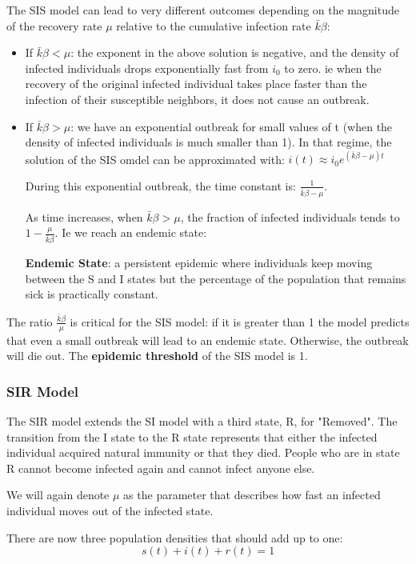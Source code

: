 \documentclass[11pt]{scrartcl} %
\begin{document}
The SIS model can lead to very different outcomes depending on the magnitude of the recovery rate $\mu$ relative to the cumulative infection rate $\bar{k} \beta$:
\begin{itemize}
	\item If $\bar{k} \beta < \mu$: the exponent in the above solution is negative, and the density of infected individuals drops exponentially fast from $i_0$ to zero. ie when the recovery of the original infected individual takes place faster than the infection of their susceptible neighbors, it does not cause an outbreak.
	\item If $\bar{k} \beta > \mu$: we have an exponential outbreak for small values of t (when the density of infected individuals is much smaller than 1). In that regime, the solution of the SIS omdel can be approximated with: $i(t) \approx i_0 e^{(\bar{k}\beta - \mu)t}$

During this exponential outbreak, the time constant is: $\frac{1}{\bar{k} \beta-\mu}$.

As time increases, when $\bar{k} \beta > \mu$, the fraction of infected individuals tends to $1-\frac{\mu}{\bar{k} \beta}$. Ie we reach an endemic state:

\textbf{Endemic State}: a persistent epidemic where individuals keep moving between the S and I states but the percentage of the population that remains sick is practically constant. 
\end{itemize}

The ratio $\frac{\bar{k} \beta}{\mu}$ is critical for the SIS model: if it is greater than 1 the model predicts that even a small outbreak will lead to an endemic state. Otherwise, the outbreak will die out. The \textbf{epidemic threshold} of the SIS model is 1.

\subsubsection{SIR Model}
The SIR model extends the SI model with a third state, R, for "Removed". The transition from the I state to the R state represents that either the infected individual acquired natural immunity or that they died. People who are in state R cannot become infected again and cannot infect anyone else.

We will again denote $\mu$ as the parameter that describes how fast an infected individual moves out of the infected state.

There are now three population densities that should add up to one:
\[ s(t) + i(t) + r(t) = 1 \]
\end{document}
